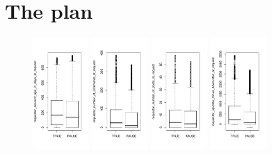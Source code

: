 \section{The plan}

\begin{figure}
	\includegraphics[width=0.19\textwidth]{data/requester_account_age_in_days_at_request}
	\includegraphics[width=0.19\textwidth]{data/requester_number_of_comments_at_request}
	\includegraphics[width=0.19\textwidth]{data/requester_number_of_posts_at_request}
	\includegraphics[width=0.19\textwidth]{data/requester_upvotes_minus_downvotes_at_request}

\end{figure}
